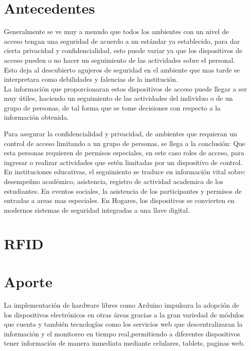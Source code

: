 \documentclass[11pt,twocolumn]{article}
\begin{document}
\section{Antecedentes}

Generalmente se ve muy a menudo que todos los ambientes  con un nivel de acceso tengan una seguridad de acuerdo a un est\'andar ya establecido, para dar cierta privacidad y confidencialidad, esto puede variar ya que los dispositivos de acceso pueden o no hacer un seguimiento de las actividades sobre el personal. Esto deja al descubierto agujeros de seguridad en el ambiente que mas tarde se interpretara como debilidades y falencias de la instituci\'on.\\

La  informaci\'on  que proporcionaran estos dispositivos de acceso puede llegar a ser muy \'utiles, haciendo un seguimiento de las actividades del individuo o de un grupo de personas, de tal forma  que se tome decisiones con respecto a la informaci\'on obtenida.
 

Para asegurar la confidencialidad y privacidad, de ambientes que requieran un control de acceso limitando a un grupo de personas, se llega a la conclusi\'on: Que esta personas  requieren de permisos especiales, en este caso roles de acceso, para ingresar o realizar actividades que est\'en limitadas por un dispositivo de control. \\

En instituciones educativas, el seguimiento se traduce en informaci\'on vital sobre: desempe\~{n}no acad\'emico, asistencia, registro de actividad academica de los estudiantes. En eventos sociales, la asistencia de los participantes y  permisos de entradas a areas mas especiales. En Hogares, los dispositivos se convierten en modernos sistemas de seguridad integradas a una llave digital.\\

\section{RFID}



\section{Aporte}

La implementaci\'on de hardware libres como Arduino impulsara la adopci\'on de los dispositivos electr\'onicos en otras \'areas gracias a la gran variedad de m\'odulos que cuenta y tambi\'en tecnolog\'ias como los servicios web que descentralizaran la informaci\'on y el monitoreo en tiempo real,permitiendo a diferentes dispositivos tener informaci\'on de manera inmediata mediante   celulares, tablets, paginas web.
\end{document}
